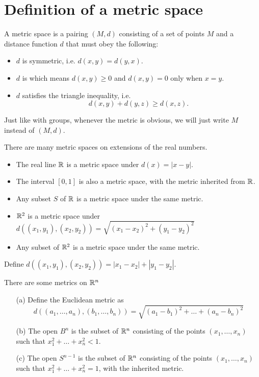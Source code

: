 \documentclass[11pt]{scrreport}
\begin{document}
\section{Definition of a metric space}
\begin{definition}
    A metric space is a pairing $(M,d)$ consisting of a set of points $M$ and a distance function $d$ that must obey the following:
    \begin{itemize}
        \item $d$ is symmetric, i.e. $d(x,y)=d(y,x)$.
        \item $d$ is  which means $d(x,y)\geq 0$ and $d(x,y)=0$ only when $x=y$.
        \item $d$ satisfies the triangle inequality, i.e.
            \[d(x,y)+d(y,z)\geq d(x,z).\]
    \end{itemize}
\end{definition}
\begin{remark}
    Just like with groups, whenever the metric is obvious, we will just write $M$ instead of $(M,d)$.
\end{remark}
\begin{example}
There are many metric spaces on extensions of the real numbers.
    \begin{itemize}
        \item The real line $\mathbb R$ is a metric space under $d(x)=|x-y|$.
        \item The interval $[0,1]$ is also a metric space, with the metric inherited from $\mathbb R$.
        \item Any subset $S$ of $\mathbb R$ is a metric space under the same metric.
        \item $\RR^2$ is a metric space under $d((x_1,y_1),(x_2,y_2))=\sqrt{(x_1-x_2)^2+(y_1-y_2)^2}$
        \item Any subset of $\RR^2$ is a metric space under the same metric.
    \end{itemize}
\end{example}
\begin{example}[Taxicab on $\RR^2$]
    Define $d((x_1,y_1),(x_2,y_2)) = |x_1-x_2|+|y_1-y_2|$.
\end{example}
\begin{example}
    There are some metrics on $\mathbb R^n$
    \begin{itemize}
        \item[(a)] Define the Euclidean metric as
        \[
            d((a_1,\dots, a_n),(b_1,\dots,b_n))=\sqrt{(a_1-b_1)^2+\dots+(a_n-b_n)^2}
        \]
        \item[(b)] The open  $B^n$ is the subset of $\mathbb R^n$ consisting of the points $(x_1,\dots,x_n)$ such that $x_1^2+\dots+x_n^2<1$. 
        \item[(c)] The open  $S^{n-1}$ is the subset of $\mathbb R^n$ consisting of the points $(x_1,\dots,x_n)$ such that $x_1^2+\dots+x_n^2=1$, with the inherited metric. 
    \end{itemize}
\end{example}
\end{document}
